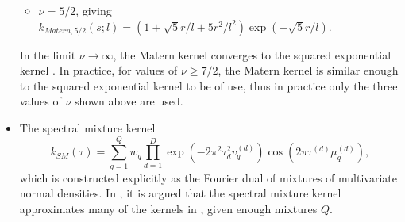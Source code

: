 \begin{itemize}
\begin{itemize}
		\item $\nu = 5/2$, giving $k_{Matern,5/2}(s;l) = \left(1 + \sqrt{5} r/l + 5 r^2/l^2 \right) \exp(-\sqrt{5}r/l)$.
	\end{itemize}
	In the limit $\nu \to \infty$, the Matern kernel converges to the squared exponential kernel \cite{Stein_1999}. In practice, for values of $\nu \geq 7/2$, the Matern kernel is similar enough to the squared exponential kernel to be of use, thus in practice only the three values of $\nu$ shown above are used.
	\item The spectral mixture kernel \cite{wilson2013gaussian}
	\begin{equation}\label{spectralmixturekernel}
	k_{SM}(\tau) = \sum_{q=1}^Q w_q \prod_{d=1}^D \exp(-2 \pi^2 \tau_d^2 v_{q}^{(d)})
	\cos(2 \pi \tau^{(d)} \mu_q^{(d)}),
	\end{equation}
	which is constructed explicitly as the Fourier dual of mixtures of multivariate normal densities. In \cite{wilson2013gaussian}, it is argued that the spectral mixture kernel approximates many of the kernels in \cite{Rasmussen06}, given enough mixtures $Q$.
\end{itemize}


